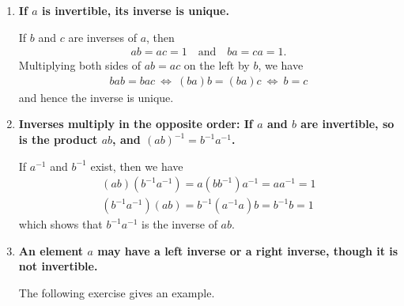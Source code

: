 \documentclass[a4paper,12pt]{article}
\begin{document}
\begin{enumerate}
\begin{enumerate}
            \item
                \boldmath
                \textbf{If $a$ is invertible, its inverse is unique.} \par
                \unboldmath
                If $b$ and $c$ are inverses of $a$, then
                \begin{align*}
                    ab = ac = 1 \quad \text{and} \quad ba = ca = 1.
                \end{align*}
                Multiplying both sides of $ab = ac$ on the left by $b$, we have
                \begin{align*}
                    bab = bac\ \Leftrightarrow\ (ba)b = (ba)c\ \Leftrightarrow\ b = c
                \end{align*}
                and hence the inverse is unique.

            \item
                \boldmath
                \textbf{Inverses multiply in the opposite order: If $a$ and $b$ are invertible, so is the product $ab$, and $(ab)^{-1} = b^{-1} a^{-1}$.} \par
                \unboldmath
                If $a^{-1}$ and $b^{-1}$ exist, then we have
                \begin{gather*}
                    (ab) \left( b^{-1} a^{-1} \right) = a \left( bb^{-1} \right) a^{-1} = aa^{-1} = 1 \\
                    \left( b^{-1} a^{-1} \right) (ab) = b^{-1} \left( a^{-1} a \right) b = b^{-1} b = 1
                \end{gather*}
                which shows that $b^{-1} a^{-1}$ is the inverse of $ab$.

            \item
                \boldmath
                \textbf{An element $a$ may have a left inverse or a right inverse, though it is not invertible.} \par
                \unboldmath
                The following exercise gives an example.
                \iffalse
                    Let $S$ denote the set of matrices under matrix multiplication. Given the elements
                    \begin{align*}
                        A = \left[
                            \begin{array}{cc}
                                1 & 0
                            \end{array}
                        \right]
                        \qquad
                        B = \left[
                            \begin{array}{c}
                                1 \\
                                0
                            \end{array}
                        \right]
                    \end{align*}
                    in $S$, $AB$ forms the $1$-by-$1$ identity matrix, and hence $A$ is the left inverse of $B$ while $B$ is the right inverse of $A$. However, neither $A$ nor $B$ is invertible.
                \fi
        \end{enumerate}


\end{enumerate}
\end{document}
